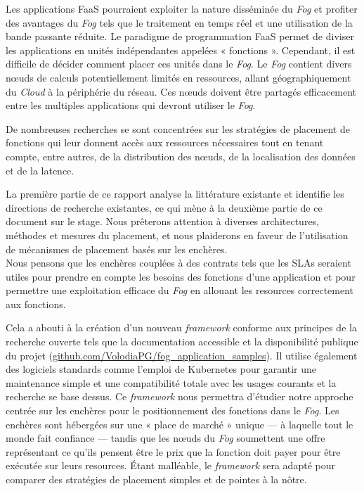 Les applications \gls{FaaS} pourraient exploiter la nature disséminée du \emph{Fog} et profiter des avantages du \emph{Fog} tels que le traitement en temps réel et une utilisation de la bande passante réduite. Le paradigme de programmation \gls{FaaS} permet de diviser les applications en unités indépendantes appelées « fonctions ». Cependant, il est difficile de décider comment placer ces unités dans le \emph{Fog}. Le \emph{Fog} contient divers nœuds de calculs potentiellement limités en ressources, allant géographiquement du \emph{Cloud} à la périphérie du réseau. Ces nœuds doivent être partagés efficacement entre les multiples applications qui devront utiliser le \emph{Fog}.

De nombreuses recherches se sont concentrées sur les stratégies de placement de fonctions qui leur donnent accès aux ressources nécessaires tout en tenant compte, entre autres, de la distribution des nœuds, de la localisation des données et de la latence.

La première partie de ce rapport analyse la littérature existante et identifie les directions de recherche existantes, ce qui mène à la deuxième partie de ce document sur le stage. Nous prêterons attention à diverses architectures, méthodes et mesures du placement, et nous plaiderons en faveur de l'utilisation de mécanismes de placement basés sur les enchères.\\
Nous pensons que les enchères couplées à des contrats tels que les \glspl{SLA} seraient utiles pour prendre en compte les besoins des fonctions d'une application et pour permettre une exploitation efficace du \emph{Fog} en allouant les resources correctement aux fonctions.

Cela a abouti à la création d'un nouveau \emph{framework} conforme aux principes de la recherche ouverte tels que la documentation accessible et la disponibilité publique du projet (\href{https://github.com/VolodiaPG/fog_application_samples}{github.com/VolodiaPG/fog\_application\_samples}). Il utilise également des logiciels standards comme l'emploi de Kubernetes pour garantir une maintenance simple et une compatibilité totale avec les usages courants et la recherche se base dessus. Ce \emph{framework} nous permettra d'étudier notre approche centrée sur les enchères pour le positionnement des fonctions dans le \emph{Fog}. Les enchères sont hébergées sur une « place de marché » unique — à laquelle tout le monde fait confiance — tandis que les nœuds du \emph{Fog} soumettent une offre représentant ce qu'ils pensent être le prix que la fonction doit payer pour être exécutée sur leurs resources. Étant malléable, le \emph{framework} sera adapté pour comparer des stratégies de placement simples et de pointes à la nôtre.

